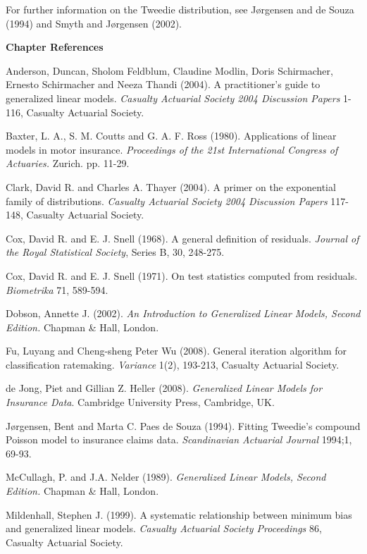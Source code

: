 For further information on the Tweedie distribution, see
J{\o}rgensen and de Souza (1994) and Smyth and J{\o}rgensen (2002).

\bigskip

\textbf{Chapter References}

\begin{multicols}{2}


Anderson, Duncan, Sholom Feldblum, Claudine Modlin, Doris
Schirmacher, Ernesto Schirmacher and Neeza Thandi (2004). A
practitioner's guide to generalized linear models. \textit{Casualty
Actuarial Society 2004 Discussion Papers} 1-116, Casualty Actuarial
Society.

Baxter, L. A., S. M. Coutts and G. A. F. Ross (1980). Applications
of linear models in motor insurance. \textit{Proceedings of the 21st
International Congress of Actuaries.} Zurich. pp. 11-29.

Clark, David R. and Charles A. Thayer (2004). A primer on the
exponential family of distributions. \textit{Casualty Actuarial
Society 2004 Discussion Papers} 117-148, Casualty Actuarial Society.

Cox, David R. and E. J. Snell (1968). A general definition of
residuals. \emph{Journal of the Royal Statistical Society}, Series
B, 30, 248-275.

Cox, David R. and E. J. Snell (1971). On test statistics computed
from residuals. \emph{Biometrika} 71, 589-594.

Dobson, Annette J. (2002). \textit{An Introduction to Generalized
Linear Models, Second Edition.} Chapman \& Hall, London.

Fu, Luyang and Cheng-sheng Peter Wu (2008). General iteration
algorithm for classification ratemaking. \textit{Variance} 1(2),
193-213, Casualty Actuarial Society.

de Jong, Piet and Gillian Z. Heller (2008). \textit{Generalized
Linear Models for Insurance Data}. Cambridge University Press,
Cambridge, UK.

J{\o}rgensen, Bent and Marta C. Paes de Souza (1994). Fitting
Tweedie's compound Poisson model to insurance claims data.
\emph{Scandinavian Actuarial Journal} 1994;1, 69-93.

McCullagh, P. and J.A. Nelder (1989). \textit{Generalized Linear
Models, Second Edition.} Chapman \& Hall, London.

Mildenhall, Stephen J. (1999). A systematic relationship between
minimum bias and generalized linear models. \textit{Casualty
Actuarial Society Proceedings} 86, Casualty Actuarial Society.


\end{multicols}
